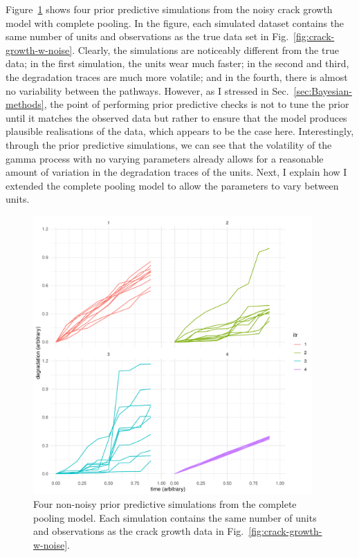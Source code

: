 Figure~\ref{fig:ppc-multi-unit} shows four prior predictive simulations from the noisy crack growth model with complete pooling. In the figure, each simulated dataset contains the same number of units and observations as the true data set in Fig.~\ref{fig:crack-growth-w-noise}. Clearly, the simulations are noticeably different from the true data; in the first simulation, the units wear much faster; in the second and third, the degradation traces are much more volatile; and in the fourth, there is almost no variability between the pathways. However, as I stressed in Sec.~\ref{sec:Bayesian-methods}, the point of performing prior predictive checks is not to tune the prior until it matches the observed data but rather to ensure that the model produces plausible realisations of the data, which appears to be the case here. Interestingly, through the prior predictive simulations, we can see that the volatility of the gamma process with no varying parameters already allows for a reasonable amount of variation in the degradation traces of the units. Next, I explain how I extended the complete pooling model to allow the parameters to vary between units.

\begin{figure}
   \centering
   \includegraphics[width=0.95\textwidth]{./figures/ch-5/PPC_multi_unit.pdf}
   \caption{Four non-noisy prior predictive simulations from the complete pooling model. Each simulation contains the same number of units and observations as the crack growth data in Fig.~\ref{fig:crack-growth-w-noise}.}
   \label{fig:ppc-multi-unit} 
\end{figure}

